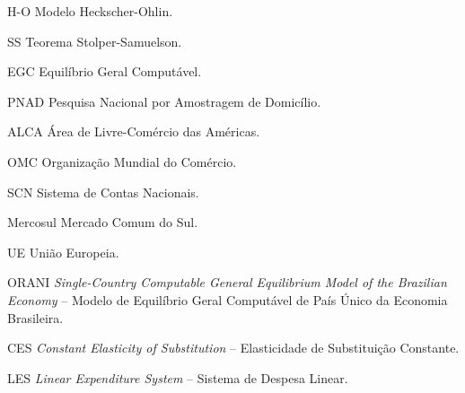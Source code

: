 

\listoffigures*
\cleardoublepage



\listofquadros*
\cleardoublepage



\listoftables*
\cleardoublepage



\begin{siglas}
	
	\item[H-O]       Modelo Heckscher-Ohlin.
	
	\item[SS]        Teorema Stolper-Samuelson.
	
	\item[EGC]       Equilíbrio Geral Computável.
	
	\item[PNAD]      Pesquisa Nacional por Amostragem de Domicílio.
	
	\item [ALCA]     Área de Livre-Comércio das Américas.
	
	\item [OMC]      Organização Mundial do Comércio.
	
	\item [SCN]      Sistema de Contas Nacionais.
	
	\item [Mercosul] Mercado Comum do Sul.
	
	\item [UE]       União Europeia.
	
	\item [ORANI]    \textit{Single-Country Computable General Equilibrium Model of the Brazilian Economy} -- Modelo de Equilíbrio Geral Computável de País Único da Economia Brasileira.
	
	\item [CES]      \textit{Constant Elasticity of Substitution} -- Elasticidade de Substituição Constante.
	
	\item [LES]      \textit{Linear Expenditure System} -- Sistema de Despesa Linear.
\end{siglas}


